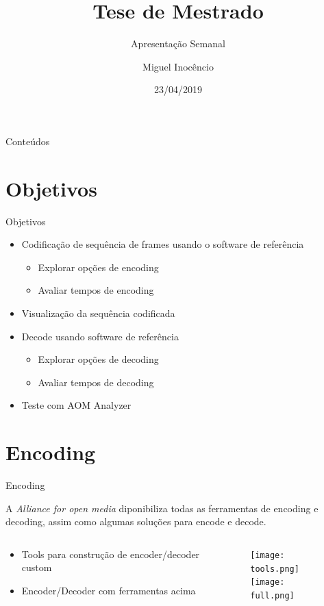 \documentclass{beamer}
\title[Apresentação Semanal]{Tese de Mestrado}
\subtitle{Apresentação Semanal}
\author[M. Inocêncio]{Miguel Inocêncio}
\institute[UA]	{Universidade de Aveiro\\ 
				Instituto de Telecomunicações}
\date{23/04/2019}
\begin{document}
\begin{frame}
	\titlepage
\end{frame}

\begin{frame}{Conteúdos}
	\tableofcontents
\end{frame}

\section{Objetivos}
\begin{frame}{Objetivos}
	\begin{itemize}
		\item Codificação de sequência de frames usando o software de referência
		\begin{itemize}
			\item Explorar opções de encoding
			\item Avaliar tempos de encoding
		\end{itemize}
		\item Visualização da sequência codificada
		\item Decode usando software de referência
		\begin{itemize}
			\item Explorar opções de decoding
			\item Avaliar tempos de decoding
		\end{itemize}		
		\item Teste com AOM Analyzer
	\end{itemize}
\end{frame}

\section{Encoding}
\begin{frame}{Encoding}

	A \textit{Alliance for open media} diponibiliza todas as ferramentas de encoding e decoding, assim como algumas soluções para encode e decode.
	
	\begin{columns}
		\begin{column}[T, onlytextwidth]{.45\textwidth}%
			\begin{itemize}
				\setlength\itemsep{3cm}
				\item Tools para construção de encoder/decoder custom 
				\item Encoder/Decoder com ferramentas acima
			\end{itemize}
		\end{column}
		\begin{column}[T]{.45\textwidth}%
			\begin{figure}				
				\texttt{[image: tools.png]}\\
				\vspace{0.75cm}
				\texttt{[image: full.png]}
			\end{figure}			
		\end{column}		
	\end{columns}	
\end{frame}
\end{document}
